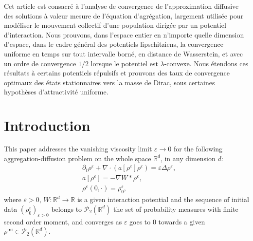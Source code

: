 \documentclass[JEP,XML,SOM,Unicode, NoFloatCountersInSection,published]{cedram}
\let\line\xspace
\newcommand{\ini}{\mathrm{ini}}
\def\RR{\mathbb{R}}
\def\eps{\varepsilon}
\def\pa{\partial}
\def\calP{{\mathcal P}}
\theoremstyle{plain}
\theoremstyle{definition}
\begin{document}



\begin{altabstract}
Cet article est consacré à l'analyse de convergence de l'approximation diffusive des solutions à valeur mesure de l'équation d'agrégation, largement utilisée pour modéliser le mouvement collectif d'une population dirigée par un potentiel d'interaction. Nous prouvons, dans l'espace entier en n'importe quelle dimension d'espace, dans le cadre général des potentiels lipschitziens, la convergence uniforme en temps sur tout intervalle borné, en distance de Wasserstein, et avec un ordre de convergence $1/2$ lorsque le potentiel est $\lambda$-convexe. Nous étendons ces résultats à certains potentiels répulsifs et prouvons des taux de convergence optimaux des états stationnaires vers la masse de Dirac, sous certaines hypothèses d'attractivité uniforme.
\end{altabstract}

\maketitle
\vspace*{-\baselineskip}
{\let\line\\ \tableofcontents}
\mainmatter

\section{Introduction}

This paper addresses the vanishing viscosity limit $\varepsilon \to 0$ for the following aggregation-diffusion problem on the whole space $\RR^d$, in any dimension $d$:
\begin{subequations}\label{eq:agg_diff}
\begin{align}
& \pa_t \rho^\eps + \nabla \cdot (a[\rho^\eps] \rho^\eps) = \eps \Delta \rho^\eps, \label{eq:rho_diff} \\
& a[\rho^\eps] = - \nabla W * \rho^\eps, \label{eq:arho_diff} \\
& \rho^\eps(0, \cdot) = \rho_0^\eps, \label{eq:rho0_diff}
\end{align}
\end{subequations}
where $\eps > 0$, $W : \RR^d \to \RR$ is a given interaction potential and the sequence of initial data $(\rho_0^\eps)_{\eps>0}$ belongs to $\calP_2(\RR^d)$ the set of probability measures with finite second order moment, and converges as $\eps$ goes to 0 towards a given $\rho^{\ini} \in \calP_2(\RR^d)$.
\end{document}
